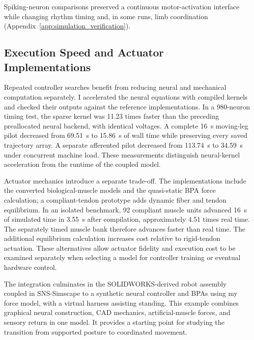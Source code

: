 \begin{samepage}
Spiking-neuron comparisons preserved a continuous motor-activation interface while changing rhythm timing and, in some runs, limb coordination (Appendix~\ref{app:simulation_verification}).\par
\end{samepage}

\subsection{Execution Speed and Actuator Implementations}\label{sec:sns_execution}

Repeated controller searches benefit from reducing neural and mechanical computation separately. I accelerated the neural equations with compiled kernels and checked their outputs against the reference implementations. In a 980-neuron timing test, the sparse kernel was 11.23 times faster than the preceding preallocated neural backend, with identical voltages. A complete \qty{16}{\second} moving-leg pilot decreased from \qty{69.51}{\second} to \qty{15.86}{\second} of wall time while preserving every saved trajectory array. A separate afferented pilot decreased from \qty{113.74}{\second} to \qty{34.59}{\second} under concurrent machine load. These measurements distinguish neural-kernel acceleration from the runtime of the coupled model.

Actuator mechanics introduce a separate trade-off. The implementations include the converted biological-muscle models and the quasi-static BPA force calculation; a compliant-tendon prototype adds dynamic fiber and tendon equilibrium. In an isolated benchmark, 92 compliant muscle units advanced \qty{16}{\second} of simulated time in \qty{3.55}{\second} after compilation, approximately 4.51 times real time. The separately timed muscle bank therefore advances faster than real time. The additional equilibrium calculation increases cost relative to rigid-tendon actuation. These alternatives allow actuator fidelity and execution cost to be examined separately when selecting a model for controller training or eventual hardware control.

The integration culminates in the SOLIDWORKS-derived robot assembly coupled in SNS-Simscape to a synthetic neural controller and BPAs using my force model, with a virtual harness assisting standing. This example combines graphical neural construction, CAD mechanics, artificial-muscle forces, and sensory return in one model. It provides a starting point for studying the transition from supported posture to coordinated movement.

